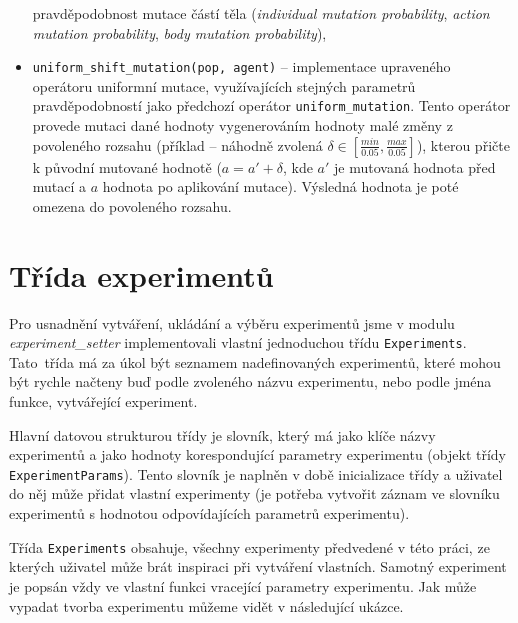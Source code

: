 \begin{itemize}
        pravděpodobnost mutace částí těla (\emph{individual mutation
        probability}, \emph{action mutation probability}, \emph{body mutation
        probability}),
    \item \texttt{uniform\_shift\_mutation(pop, agent)} -- implementace
        upraveného operátoru uniformní mutace, využívajících stejných parametrů
        pravděpodobností jako předchozí operátor \texttt{uniform\_mutation}.
        Tento operátor provede mutaci dané hodnoty vygenerováním hodnoty malé
        změny z povoleného rozsahu (příklad -- náhodně zvolená
        $\delta\in[\frac{min}{0.05}, \frac{max}{0.05}]$), kterou přičte k
        původní mutované hodnotě ($a = a' + \delta$, kde $a'$ je mutovaná
        hodnota před mutací a $a$ hodnota po aplikování mutace). Výsledná
        hodnota je poté omezena do povoleného rozsahu.
\end{itemize}

\section{Třída experimentů} \label{imp:experimentsetter}
Pro usnadnění vytváření, ukládání a výběru experimentů jsme v modulu
\emph{experiment\_setter} implementovali vlastní jednoduchou třídu
\texttt{Experiments}. Tato~třída má za úkol být seznamem nadefinovaných
experimentů, které mohou být rychle načteny buď podle zvoleného názvu
experimentu, nebo podle jména funkce, vytvářející experiment.

Hlavní datovou strukturou třídy je slovník, který má jako klíče názvy
experimentů a jako hodnoty korespondující parametry experimentu (objekt třídy
\texttt{ExperimentParams}). Tento slovník je naplněn v době inicializace třídy
a uživatel do něj může přidat vlastní experimenty (je potřeba vytvořit záznam
ve slovníku experimentů s hodnotou odpovídajících parametrů experimentu).

Třída \texttt{Experiments} obsahuje, všechny experimenty předvedené v této
práci, ze kterých uživatel může brát inspiraci při vytváření vlastních. Samotný
experiment je popsán vždy ve vlastní funkci vracející parametry experimentu.
Jak může vypadat tvorba experimentu můžeme vidět v následující ukázce.

